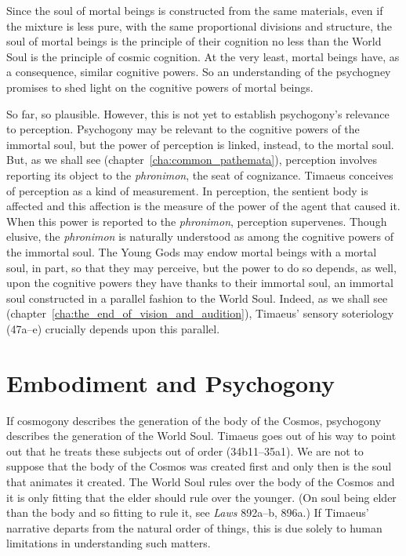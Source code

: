 Since the soul of mortal beings is constructed from the same materials, even if the mixture is less pure, with the same proportional divisions and structure, the soul of mortal beings is the principle of their cognition no less than the World Soul is the principle of cosmic cognition. At the very least, mortal beings have, as a consequence, similar cognitive powers. So an understanding of the psychogney promises to shed light on the cognitive powers of mortal beings.

So far, so plausible. However, this is not yet to establish psychogony's relevance to perception. Psychogony may be relevant to the cognitive powers of the immortal soul, but the power of perception is linked, instead, to the mortal soul. But, as we shall see (chapter~\ref{cha:common_pathemata}), perception involves reporting its object to the \emph{phronimon}, the seat of cognizance. Timaeus conceives of perception as a kind of measurement. In perception, the sentient body is affected and this affection is the measure of the power of the agent that caused it. When this power is reported to the \emph{phronimon}, perception supervenes. Though elusive, the \emph{phronimon} is naturally understood as among the cognitive powers of the immortal soul. The Young Gods may endow mortal beings with a mortal soul, in part, so that they may perceive, but the power to do so depends, as well, upon the cognitive powers they have thanks to their immortal soul, an immortal soul constructed in a parallel fashion to the World Soul. Indeed, as we shall see (chapter~\ref{cha:the_end_of_vision_and_audition}), Timaeus' sensory soteriology (47a--e) crucially depends upon this parallel.



\section{Embodiment and Psychogony} %
\label{sec:embodiment_and_psychogony}

If cosmogony describes the generation of the body of the Cosmos, psychogony describes the generation of the World Soul. Timaeus goes out of his way to point out that he treats these subjects out of order (34b11--35a1). We are not to suppose that the body of the Cosmos was created first and only then is the soul that animates it created. The World Soul rules over the body of the Cosmos and it is only fitting that the elder should rule over the younger. (On soul being elder than the body and so fitting to rule it, see \emph{Laws} 892a--b, 896a.) If Timaeus' narrative departs from the natural order of things, this is due solely to human limitations in understanding such matters.

